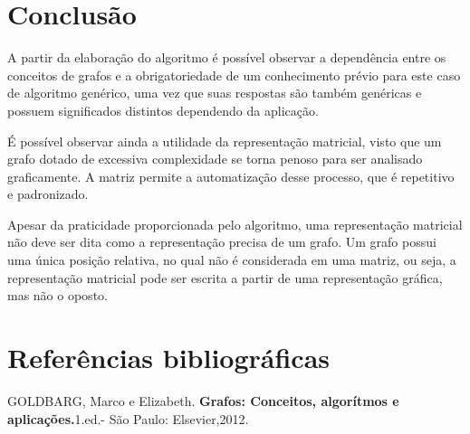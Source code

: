 \documentclass[a4paper, 12pt]{article}
\begin{document}
\section{Conclusão}

    A partir da elaboração do algoritmo é possível observar a dependência entre os conceitos de grafos e a obrigatoriedade de um conhecimento prévio para este caso de algoritmo genérico, uma vez que suas respostas são também genéricas e possuem significados distintos dependendo da aplicação. 
    
    \indent É possível observar ainda a utilidade da representação matricial, visto que um grafo dotado de excessiva complexidade se torna penoso para ser analisado graficamente. A matriz permite a automatização desse processo, que é repetitivo e padronizado.
    
    \indent Apesar da praticidade proporcionada pelo algoritmo, uma representação matricial não deve ser dita como a representação precisa de um grafo. Um grafo possui uma única posição relativa, no qual não é considerada em uma matriz, ou seja, a representação matricial pode ser escrita a partir de uma representação gráfica, mas não o oposto.

\section{Referências bibliográficas}
GOLDBARG, Marco e Elizabeth. \textbf{Grafos: Conceitos, algorítmos e aplicações.}1.ed.- São Paulo: Elsevier,2012.
\end{document}
